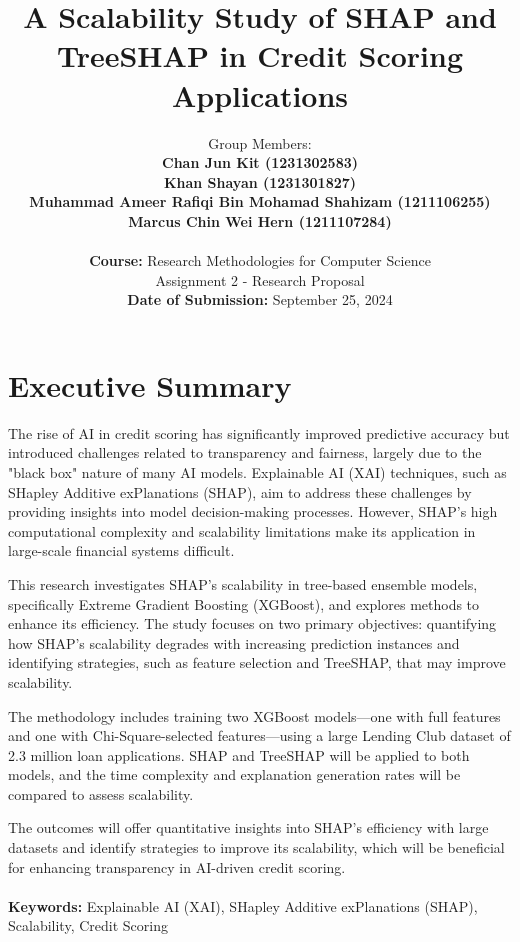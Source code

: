\documentclass[12pt,a4paper]{article}
\title{A Scalability Study of SHAP and TreeSHAP in Credit Scoring Applications}
\author{Group Members: \\
\textbf{Chan Jun Kit (1231302583)} \\
\textbf{Khan Shayan (1231301827)} \\
\textbf{Muhammad Ameer Rafiqi Bin Mohamad Shahizam (1211106255)} \\
\textbf{Marcus Chin Wei Hern (1211107284)} \\
\\
\textbf{Course:} Research Methodologies for Computer Science \\
Assignment 2 - Research Proposal \\
\textbf{Date of Submission:} September 25, 2024}
\date{}
\begin{document}
\maketitle
\newpage

\section*{Executive Summary}
The rise of AI in credit scoring has significantly improved predictive accuracy but introduced challenges related to transparency and fairness, largely due to the "black box" nature of many AI models. Explainable AI (XAI) techniques, such as SHapley Additive exPlanations (SHAP), aim to address these challenges by providing insights into model decision-making processes. However, SHAP's high computational complexity and scalability limitations make its application in large-scale financial systems difficult.

This research investigates SHAP’s scalability in tree-based ensemble models, specifically Extreme Gradient Boosting (XGBoost), and explores methods to enhance its efficiency. The study focuses on two primary objectives: quantifying how SHAP’s scalability degrades with increasing prediction instances and identifying strategies, such as feature selection and TreeSHAP, that may improve scalability.

The methodology includes training two XGBoost models—one with full features and one with Chi-Square-selected features—using a large Lending Club dataset of 2.3 million loan applications. SHAP and TreeSHAP will be applied to both models, and the time complexity and explanation generation rates will be compared to assess scalability.

The outcomes will offer quantitative insights into SHAP's efficiency with large datasets and identify strategies to improve its scalability, which will be beneficial for enhancing transparency in AI-driven credit scoring.
\hfill
\\ \\
\textbf{Keywords:} Explainable AI (XAI), SHapley Additive exPlanations (SHAP), Scalability, Credit Scoring \\
\newpage

\tableofcontents
\newpage

\end{document}

